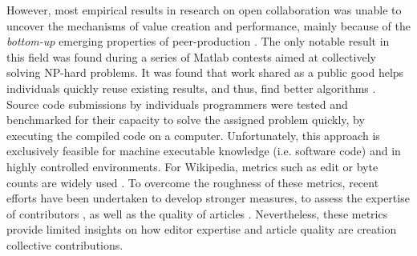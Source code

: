 However, most empirical results in research on open collaboration was unable to uncover the mechanisms of value creation and performance, mainly because of the {\it bottom-up} emerging properties of peer-production \cite{benkler2002}.  The only notable result in this field was found during a series of Matlab contests aimed at collectively solving NP-hard problems. It was found that work shared as a public good helps individuals quickly reuse existing results, and thus, find better algorithms \cite{gulley2010}. Source code submissions by individuals programmers were tested and benchmarked for their capacity to solve the assigned problem quickly, by executing the compiled code on a computer. Unfortunately, this approach is exclusively feasible for machine executable knowledge (i.e. software code) and in highly controlled environments. For Wikipedia, metrics such as edit or byte counts are widely used \cite{burke2008taking}.  To overcome the roughness of these metrics, recent efforts have been undertaken to develop stronger measures, to assess the expertise of contributors \cite{geiger2013}, as well as the quality of articles \cite{wang2013tell}. Nevertheless, these metrics provide limited insights on how editor expertise and article quality are creation collective contributions.